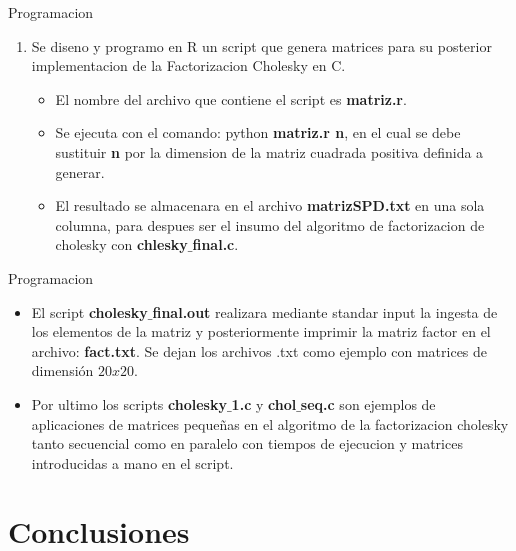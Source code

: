 \documentclass{beamer}
\begin{document}
\begin{frame}{Programacion}
\begin{enumerate}
\item Se diseno y programo en R un script que genera matrices para su posterior implementacion de la Factorizacion Cholesky en C.
	\begin{itemize}
	\item El nombre del archivo que contiene el script es \textbf{matriz.r}.
	\item Se ejecuta con el comando: python \textbf{matriz.r n}, en el cual se debe sustituir \textbf{n} por la dimension de la matriz cuadrada positiva definida a generar.
	\item El resultado se almacenara en el archivo \textbf{matrizSPD.txt} en una sola columna, para despues ser el insumo del algoritmo de factorizacion de cholesky con \textbf{chlesky$\_$final.c}.
	\end{itemize}
\end{enumerate}
\end{frame}

\begin{frame}{Programacion}
\begin{itemize}
\item El script \textbf{cholesky$\_$final.out} realizara mediante standar input la ingesta de los elementos de la matriz y posteriormente imprimir la matriz factor en el archivo: \textbf{fact.txt}. Se dejan los archivos .txt como ejemplo con matrices de dimensión $20 x 20$. 
\item Por ultimo los scripts \textbf{cholesky$\_$1.c} y \textbf{chol$\_$seq.c} son ejemplos de aplicaciones de matrices pequeñas en el algoritmo de la factorizacion cholesky tanto secuencial como en paralelo con tiempos de ejecucion y matrices introducidas a mano en el script.
\end{itemize}
\end{frame}


\section*{Conclusiones}
\end{document}
